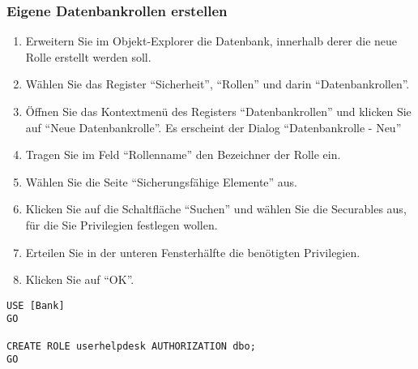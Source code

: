         \subsubsection{Eigene Datenbankrollen erstellen}
          \begin{enumerate}
              \item Erweitern Sie im Objekt-Explorer die Datenbank, innerhalb
              derer die neue Rolle erstellt werden soll.
              \item Wählen Sie das Register \enquote{Sicherheit},
              \enquote{Rollen} und darin \enquote{Datenbankrollen}.
              \item Öffnen Sie das Kontextmenü des Registers
              \enquote{Datenbankrollen} und klicken Sie auf \enquote{Neue
              Datenbankrolle}. Es erscheint der Dialog \enquote{Datenbankrolle
              - Neu}
\clearpage
              \item Tragen Sie im Feld \enquote{Rollenname} den Bezeichner der
              Rolle ein.
              \item Wählen Sie die Seite \enquote{Sicherungsfähige Elemente}
              aus.
              \item Klicken Sie auf die Schaltfläche \enquote{Suchen} und wählen
              Sie die Securables aus, für die Sie Privilegien festlegen
              wollen.
              \item Erteilen Sie in der unteren Fensterhälfte die benötigten
              Privilegien.
              \item Klicken Sie auf \enquote{OK}.
          \end{enumerate}
           \begin{lstlisting}[language=ms_sql, caption={Erstellen einer
           Datenbankrolle}, label=admin19_18]
USE [Bank]
GO

CREATE ROLE userhelpdesk AUTHORIZATION dbo;
GO
        \end{lstlisting}
          \begin{literaturinternet}
            \item \cite{ms187936}
          \end{literaturinternet}
